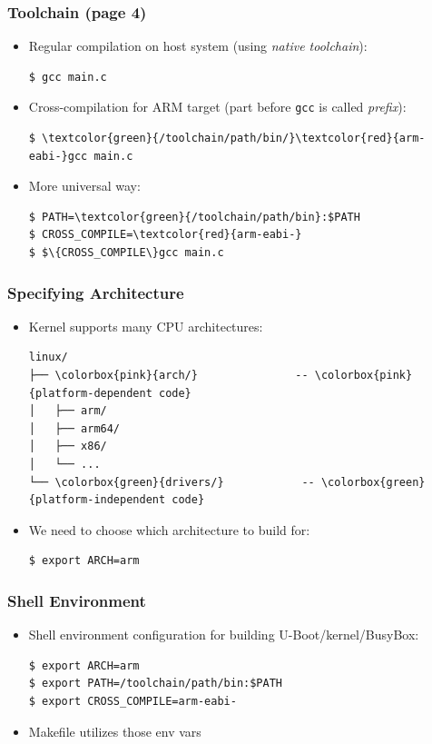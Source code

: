 \documentclass[aspectratio=169]{beamer}
\begin{document}
\begin{frame}[fragile]
  \frametitle{Toolchain (page 4)}
  \begin{itemize}
  \item Regular compilation on host system (using \textit{native toolchain}):
  \begin{Verbatim}
$ gcc main.c
  \end{Verbatim}
  \pause
  \vspace*{5mm}
  \item Cross-compilation for ARM target (part before \texttt{gcc} is called
        \textit{prefix}):
  \begin{Verbatim}[commandchars=\\\{\}]
$ \textcolor{green}{/toolchain/path/bin/}\textcolor{red}{arm-eabi-}gcc main.c
  \end{Verbatim}
  \pause
  \vspace*{5mm}
  \item More universal way:
  \begin{Verbatim}[commandchars=\\\{\}]
$ PATH=\textcolor{green}{/toolchain/path/bin}:$PATH
$ CROSS_COMPILE=\textcolor{red}{arm-eabi-}
$ $\{CROSS_COMPILE\}gcc main.c
  \end{Verbatim}
  \end{itemize}
\end{frame}

\begin{frame}[fragile]
  \frametitle{Specifying Architecture}
  \begin{itemize}
    \item Kernel supports many CPU architectures:
    \begin{Verbatim}[commandchars=\\\{\}]
linux/
├── \colorbox{pink}{arch/}               -- \colorbox{pink}{platform-dependent code}
│   ├── arm/
│   ├── arm64/
│   ├── x86/
│   └── ...
└── \colorbox{green}{drivers/}            -- \colorbox{green}{platform-independent code}
    \end{Verbatim}
    \bigskip
    \item We need to choose which architecture to build for:
    \begin{verbatim}
$ export ARCH=arm
    \end{verbatim}
  \end{itemize}
\end{frame}

\begin{frame}[fragile]
  \frametitle{Shell Environment}
  \begin{itemize}
  \item Shell environment configuration for building U-Boot/kernel/BusyBox:
  \begin{verbatim}
$ export ARCH=arm
$ export PATH=/toolchain/path/bin:$PATH
$ export CROSS_COMPILE=arm-eabi-
  \end{verbatim}
  \item Makefile utilizes those env vars
  \end{itemize}
\end{frame}
\end{document}
